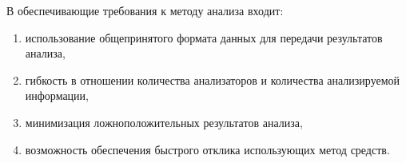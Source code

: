 В обеспечивающие требования к методу анализа входит:
\begin{enumerate}[label=\arabic*.]
    \item использование общепринятого формата данных для передачи результатов анализа,
    \item гибкость в отношении количества анализаторов и количества анализируемой информации,
    \item минимизация ложноположительных результатов анализа,
    \item возможность обеспечения быстрого отклика использующих метод средств.
\end{enumerate}


\clearpage